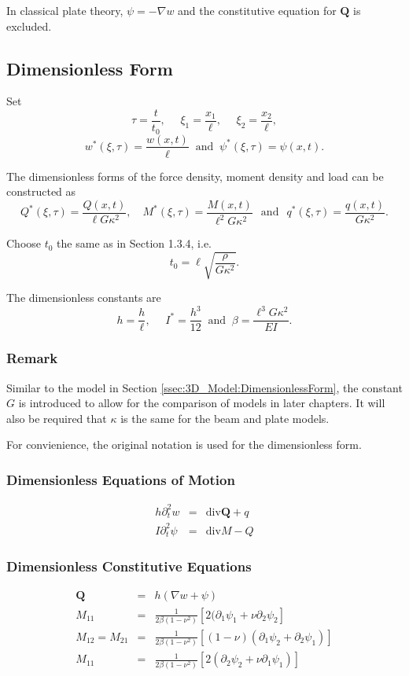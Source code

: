 \documentclass[../../main.tex]{subfiles}
\begin{document}
	In classical plate theory, $\psi = -\nabla w$ and the constitutive equation for $\mathbf{Q}$ is excluded.
	
	\subsection{Dimensionless Form}\label{ssec:P_Model:DimensionlessForm}
	
	Set
	\[\tau = \frac{t}{t_0}, \,\, \quad \xi_1 = \frac{x_1}{\ell}, \,\, \quad \xi_2 = \frac{x_2}{\ell},\] 
	\[w^*(\xi,\tau) = \frac{w(x,t)}{\ell} \ \text{ and } \ {\psi}^*(\xi, \tau) = {\psi}(x,t).\]
	
	The dimensionless forms of the force density, moment density and load can be constructed as \[ Q^{*}(\xi,\tau) = \frac{Q(x,t)}{\ell G\kappa^2}, \quad M^{*}(\xi,\tau) = \frac{M(x,t)}{\ell^2 G\kappa^2} \,\,\, \ \text{and} \ \,\,\, q^*(\xi,\tau) = \frac{q(x,t)}{G\kappa^2}.\]
	
	Choose $t_0$ the same as in Section 1.3.4, i.e. \[t_0 = \ell\sqrt{\frac{\rho}{G\kappa^2}}.\]
	
	The dimensionless constants are
	\[h = \frac{h}{\ell}, \,\, \quad I^* = \frac{h^3}{12} \ \text{ and } \  \beta = \frac{\ell^3G\kappa^2}{EI}.\]
	
	\subsubsection{Remark}
	Similar to the model in Section \ref{ssec:3D_Model:DimensionlessForm}, the constant $G$ is introduced to allow for the comparison of models in later chapters. It will also be required that $\kappa$ is the same for the beam and plate models.
	
	For convienience, the original notation is used for the dimensionless form.

	\subsubsection{Dimensionless Equations of Motion}\label{sssec:P_Model:EquationsOfMotionD}
	\begin{eqnarray}
		h \partial_t^2 w & = & \textrm{div} \mathbf{Q} + q \label{eq:P_Model:EM1D} \\
		I \partial_t^2 {\psi} & = & \textrm{div} M - Q \label{eq:P_Model:EM2D_chap1}
	\end{eqnarray}
	\subsubsection{Dimensionless Constitutive Equations}\label{sssec:P_Model:ConstitutiveEquationsD}
	\begin{eqnarray}
		\mathbf{Q} & = & h(\nabla w + \psi) \label{eq:P_Model:CE1D}\\
		M_{11} & = & \frac{1}{2\beta(1-\nu^2)} \left[ 2(\partial_1\psi_1 + \nu \partial_2 \psi_2 \right] \label{eq:P_Model:CE2D}\\
		M_{12} = M_{21} & = & \frac{1}{2\beta(1-\nu^2)} \left[ (1-\nu)(\partial_1\psi_2 + \partial_2 \psi_1) \right] \label{eq:P_Model:CE3D}\\
		M_{11} & = & \frac{1}{2\beta(1-\nu^2)} \left[ 2(\partial_2 \psi_2 + \nu \partial_1 \psi_1)\right] \label{eq:P_Model:CE4D_chap1}
	\end{eqnarray}
\end{document}
